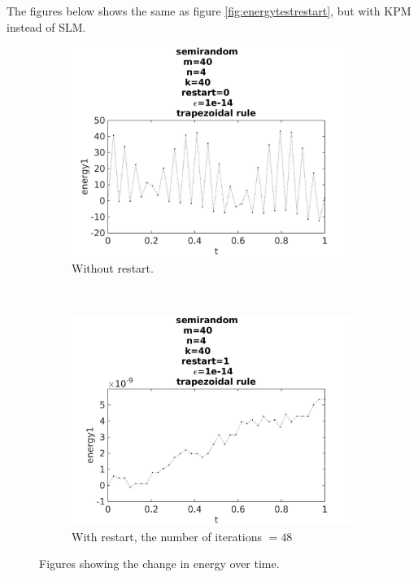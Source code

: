 The figures below shows the same as figure \ref{fig:energytestrestart}, but with KPM instead of SLM. 

\begin{figure}[H]
        \centering
        \begin{subfigure}[b]{0.45\textwidth}
                \includegraphics[width=\textwidth]{../MATLAB/fig/energyarnrestart0.jpg}
                \caption{  Without restart. }
                \label{fig:energyarnrestart0}
        \end{subfigure}%
        ~
        \begin{subfigure}[b]{0.45\textwidth}
                \includegraphics[width=\textwidth]{../MATLAB/fig/energyarnrestart1.jpg}
                \caption{ With restart, the number of iterations $ = 48$ }
                \label{fig:energyarnrestart1}
        \end{subfigure}
        \caption{ Figures showing the change in energy over time. }
        \label{fig:energyarnrestart}
\end{figure}

